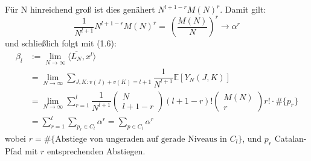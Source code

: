 \documentclass[a4paper, 11pt]{scrreprt}
\newcommand{\EE}{\mathbb{E}}
\newcommand{\student}[1]{\marginnote{{\normalfont\bf #1}}}
\begin{document}
Für N hinreichend groß ist dies genähert \(N^{l+1-r}M(N)^r\). Damit gilt:
	\begin{equation}
		\frac {1}{N^{l+1}} N^{l+1-r}M(N)^r =~ \left( \dfrac{M(N)}{N}\right)^{r}\to \alpha^r
	\end{equation}
und schließlich folgt mit (1.6):
	\begin{align*}
		\beta_l &:= \lim_{N\to\infty} \langle \overline{L_N}, x^l \rangle\\
		&= \lim_{N \to \infty} \sum_{J,K: v(J)+v(K) = l+1} \dfrac{1}{N^{l+1}}\EE[Y_N(J,K)]\\
		&= \lim_{N \to \infty} \sum_{r=1}^{l} \dfrac{1}{N^{l+1}} \begin{pmatrix} N\\ l+1-r\end{pmatrix} (l+1-r)! \begin{pmatrix} M(N)\\r\end{pmatrix} r!	\cdot \#\{p_r \}\\
		&= \sum_{r=1}^{l} \sum_{p_{r} \in C_{l}} \alpha^{r} = \sum_{p\in C_l} \alpha^r
	\end{align*}
wobei \(r=\#\{\text{Abstiege von ungeraden auf gerade Niveaus in } C_l\}\), und \(p_r\) Catalan-Pfad mit \(r\) entsprechenden Abstiegen.\\

\student{Dominik}
\end{document}
